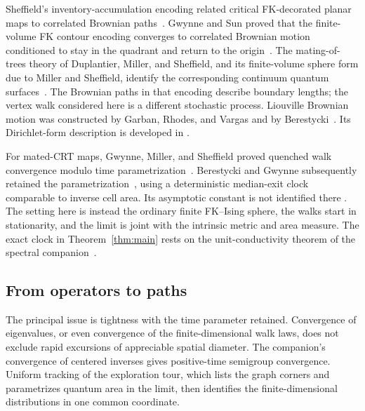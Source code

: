 Sheffield's inventory-accumulation encoding related critical FK-decorated
planar maps to correlated Brownian paths~\cite{Sheffield2016Inventory}.
Gwynne and Sun proved that the finite-volume FK contour encoding converges
to correlated Brownian motion conditioned to stay in the quadrant and
return to the origin~\cite[Theorem~1.8]{GwynneSun2015Finite}.
The mating-of-trees theory of Duplantier, Miller, and Sheffield, and its
finite-volume sphere form due to Miller and Sheffield, identify the
corresponding continuum quantum
surfaces~\cite{DuplantierMillerSheffield2021Mating,MillerSheffield2019SphereMating}.
The Brownian paths in that encoding describe boundary lengths; the vertex
walk considered here is a different stochastic process.
Liouville Brownian motion was constructed by Garban, Rhodes, and Vargas
and by Berestycki~\cite{GarbanRhodesVargas2016LBM,Berestycki2015Diffusion}.
Its Dirichlet-form description is developed in
\cite[Theorem~1.7]{GarbanRhodesVargas2014Dirichlet}.

For mated-CRT maps, Gwynne, Miller, and Sheffield proved quenched walk
convergence modulo time
parametrization~\cite[Theorem~3.4]{GwynneMillerSheffield2021Tutte}.
Berestycki and Gwynne subsequently retained the
parametrization~\cite[Theorems~1.2 and~1.4]{BerestyckiGwynne2022MatedCRTLBM},
using a deterministic median-exit clock comparable to inverse cell area.
Its asymptotic constant is not identified there
\cite[Remark~1.3]{BerestyckiGwynne2022MatedCRTLBM}.
The setting here is instead the ordinary finite FK--Ising sphere, the
walks start in stationarity, and the limit is joint with the intrinsic
metric and area measure. The exact clock in Theorem~\ref{thm:main} rests
on the unit-conductivity theorem of the spectral
companion~\cite[Theorem~5.2]{SC}.

\subsection{From operators to paths}

The principal issue is tightness with the time parameter retained.
Convergence of eigenvalues, or even convergence of the finite-dimensional
walk laws, does not exclude rapid excursions of appreciable spatial
diameter. The companion's convergence of centered inverses gives
positive-time semigroup convergence. Uniform tracking of the exploration
tour, which lists the graph corners and parametrizes quantum area in the
limit, then identifies the finite-dimensional distributions in one common
coordinate.

